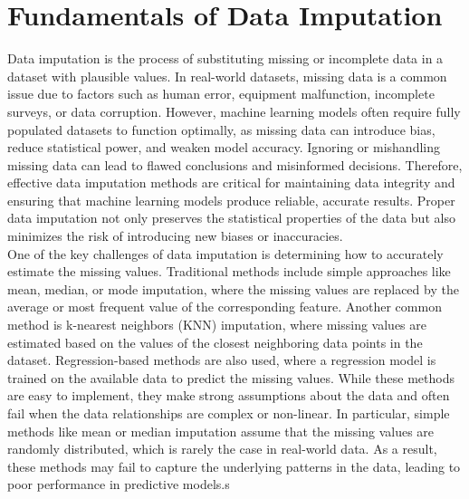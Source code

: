 \documentclass{article}
\begin{document}
\section{Fundamentals of Data Imputation}
Data imputation is the process of substituting missing or incomplete data in a dataset with plausible values. In real-world datasets, missing data is a common issue due to factors such as human error, equipment malfunction, incomplete surveys, or data corruption. However, machine learning models often require fully populated datasets to function optimally, as missing data can introduce bias, reduce statistical power, and weaken model accuracy. Ignoring or mishandling missing data can lead to flawed conclusions and misinformed decisions. Therefore, effective data imputation methods are critical for maintaining data integrity and ensuring that machine learning models produce reliable, accurate results. Proper data imputation not only preserves the statistical properties of the data but also minimizes the risk of introducing new biases or inaccuracies.
\\

One of the key challenges of data imputation is determining how to accurately estimate the missing values. Traditional methods include simple approaches like mean, median, or mode imputation, where the missing values are replaced by the average or most frequent value of the corresponding feature. Another common method is k-nearest neighbors (KNN) imputation, where missing values are estimated based on the values of the closest neighboring data points in the dataset. Regression-based methods are also used, where a regression model is trained on the available data to predict the missing values. While these methods are easy to implement, they make strong assumptions about the data and often fail when the data relationships are complex or non-linear. In particular, simple methods like mean or median imputation assume that the missing values are randomly distributed, which is rarely the case in real-world data. As a result, these methods may fail to capture the underlying patterns in the data, leading to poor performance in predictive models.s
\\
\end{document}
